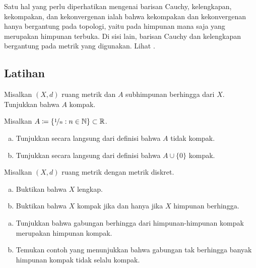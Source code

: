 \begin{remark}
Satu hal yang perlu diperhatikan mengenai barisan Cauchy, kelengkapan, kekompakan,
dan kekonvergenan ialah bahwa kekompakan dan kekonvergenan hanya bergantung pada
topologi, yaitu pada himpunan mana saja yang merupakan himpunan terbuka.  Di sisi lain,
barisan Cauchy dan kelengkapan bergantung pada metrik yang digunakan.
Lihat .
\end{remark}

\subsection{Latihan}

\begin{exercise}
Misalkan $(X,d)$ ruang metrik dan $A$ subhimpunan berhingga dari $X$.
Tunjukkan bahwa $A$ kompak.
\end{exercise}

\begin{samepage}
\begin{exercise}
Misalkan $A \coloneqq \{ \nicefrac{1}{n} : n \in {\mathbb{N}} \} \subset {\mathbb{R}}$.
\begin{enumerate}[a)]
\item
Tunjukkan secara langsung dari definisi bahwa $A$
tidak kompak.
\item
Tunjukkan secara langsung dari definisi bahwa $A \cup \{ 0 \}$
kompak.
\end{enumerate}
\end{exercise}
\end{samepage}


\begin{exercise}
Misalkan $(X,d)$ ruang metrik dengan metrik diskret.
\begin{enumerate}[a)]
\item
Buktikan bahwa $X$ lengkap.
\item
Buktikan bahwa $X$ kompak jika dan hanya jika $X$ himpunan berhingga.
\end{enumerate}
\end{exercise}

\begin{exercise}
\leavevmode
\begin{enumerate}[a)]
\item
Tunjukkan bahwa gabungan berhingga dari himpunan-himpunan kompak merupakan himpunan kompak.
\item
Temukan contoh yang menunjukkan bahwa gabungan tak berhingga banyak himpunan kompak tidak selalu
kompak.
\end{enumerate}
\end{exercise}

